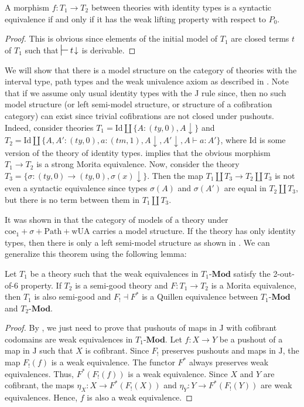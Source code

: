 \documentclass[reqno]{amsart}
\theoremstyle{definition}
\theoremstyle{remark}
\newcommand{\cat}[1]{\mathbf{#1}}
\newcommand{\Mod}[1]{#1\text{-}\cat{Mod}}
\newcommand{\IdT}{\mathrm{Id}}
\newcommand{\wUA}{\mathrm{wUA}}
\newcommand{\coeT}{\mathrm{coe}}
\newcommand{\PathT}{\mathrm{Path}}
\newcommand{\ty}{\mathit{ty}}
\newcommand{\tm}{\mathit{tm}}
\newcommand{\J}{\mathrm{J}}
\numberwithin{figure}{section}
\begin{document}
\begin{prop}
A morphism $f : T_1 \to T_2$ between theories with identity types is a syntactic equivalence if and only if it has the weak lifting property with respect to $P_0$.
\end{prop}
\begin{proof}
This is obvious since elements of the initial model of $T_1$ are closed terms $t$ of $T_1$ such that $\sststile{}{} t\!\downarrow$ is derivable.
\end{proof}

We will show that there is a model structure on the category of theories with the interval type, path types and the weak univalence axiom as described in \cite{alg-models}.
Note that if we assume only usual identity types with the J rule since, then no such model structure (or left semi-model structure, or structure of a cofibration category) can exist since trivial cofibrations are not closed under pushouts.
Indeed, consider theories $T_1 = \IdT \amalg \{ A : (\ty,0), A\!\downarrow \}$ and $T_2 = \IdT \amalg \{ A, A' : (\ty,0), a : (\tm,1), A\!\downarrow, A'\!\downarrow, A \vdash a : A' \}$, where $\IdT$ is some version of the theory of identity types.
 implies that the obvious morphism $T_1 \to T_2$ is a strong Morita equivalence.
Now, consider the theory $T_3 = \{ \sigma : (\ty,0) \to (\ty,0), \sigma(x)\!\downarrow \}$.
Then the map $T_1 \amalg T_3 \to T_2 \amalg T_3$ is not even a syntactic equivalence since types $\sigma(A)$ and $\sigma(A')$ are equal in $T_2 \amalg T_3$, but there is no term between them in $T_1 \amalg T_3$.

It was shown in \cite{alg-models} that the category of models of a theory under $\coeT_1 + \sigma + \PathT + \wUA$ carries a model structure.
If the theory has only identity types, then there is only a left semi-model structure as shown in \cite{kap-lum-model}.
We can generalize this theorem using the following lemma:

\begin{lem}
Let $T_1$ be a theory such that the weak equivalences in $\Mod{T_1}$ satisfy the 2-out-of-6 property.
If $T_2$ is a semi-good theory and $F : T_1 \to T_2$ is a Morita equivalence, then $T_1$ is also semi-good and $F_! \dashv F^*$ is a Quillen equivalence between $\Mod{T_1}$ and $\Mod{T_2}$.
\end{lem}
\begin{proof}
By , we just need to prove that pushouts of maps in $\J$ with cofibrant codomains are weak equivalences in $\Mod{T_1}$.
Let $f : X \to Y$ be a pushout of a map in $\J$ such that $X$ is cofibrant.
Since $F_!$ preserves pushouts and maps in $\J$, the map $F_!(f)$ is a weak equivalence.
The functor $F^*$ always preserves weak equivalences.
Thus, $F^*(F_!(f))$ is a weak equivalence.
Since $X$ and $Y$ are cofibrant, the maps $\eta_X : X \to F^*(F_!(X))$ and $\eta_Y : Y \to F^*(F_!(Y))$ are weak equivalences.
Hence, $f$ is also a weak equivalence.
\end{proof}
\end{document}
